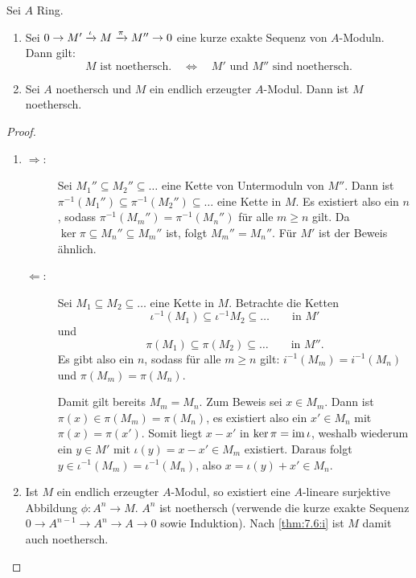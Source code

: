 \documentclass[12pt,a4paper]{scrartcl}
\theoremstyle{cplain}
\theoremstyle{cdef}
\begin{document}

\begin{satz} \label{thm:7.6}
	Sei $A$ Ring.
	\begin{enumerate}
		\item \label{thm:7.6:i} Sei $0\to M'\xrightarrow{\iota} M\xrightarrow{\pi} M''\to 0$ eine kurze exakte Sequenz von $A$-Moduln. Dann gilt:
		\[\text{$M$ ist noethersch.} \quad \Longleftrightarrow\quad \text{$M'$ und $M''$ sind noethersch.}\]
		\item Sei $A$ noethersch und $M$ ein endlich erzeugter $A$-Modul. Dann ist $M$ noethersch.\label{thm:7.6:ii}
	\end{enumerate}
\end{satz}
\begin{proof}
	\leavevmode
	\begin{enumerate}[label=\ref{thm:7.6:\roman*}]
		\item \begin{description}
			\item[\glqq$\Rightarrow$\grqq:] Sei $M_1''\subseteq M_2''\subseteq \dots$ eine Kette von Untermoduln von $M''$. Dann ist $\pi^{-1}(M_1'')\subseteq \pi^{-1}(M_2'')\subseteq \dots$ eine Kette in $M$. Es existiert also ein $n$, sodass $\pi^{-1}(M_m'') = \pi^{-1}(M_n'')$ für alle $m\geq n$ gilt. Da $\ker\pi\subseteq M_n''\subseteq M_m''$ ist, folgt $M_m'' = M_n''$. Für $M'$ ist der Beweis ähnlich.
			\item[\glqq$\Leftarrow$\grqq:] Sei $M_1\subseteq M_2\subseteq\dots$ eine Kette in $M$. Betrachte die Ketten
			\[\iota^{-1}(M_1)\subseteq \iota^{-1}M_2\subseteq\dots\qquad \text{in }M'\]
			und
			\[\pi(M_1)\subseteq \pi(M_2)\subseteq \dots \qquad \text{in }M''.\]
			Es gibt also ein $n$, sodass für alle $m\geq n$ gilt: $i^{-1}(M_m) = i^{-1}(M_n)$ und $\pi(M_m) = \pi(M_n)$.
			
			Damit gilt bereits $M_m = M_n$. Zum Beweis sei $x\in M_m$. Dann ist $\pi(x) \in \pi(M_m) = \pi(M_n)$, es existiert also ein $x'\in M_n$ mit $\pi(x) = \pi(x')$. Somit liegt $x-x'$ in $\operatorname{ker} \pi = \operatorname{im}  \iota$, weshalb wiederum ein $y \in M'$ mit $\iota(y) = x-x'\in M_m$ existiert. Daraus folgt $y\in \iota^{-1}(M_m) = \iota^{-1}(M_n)$, also $x = \iota(y) +x' \in M_n$.
		\end{description}
		\item Ist $M$ ein endlich erzeugter $A$-Modul, so existiert eine $A$-lineare surjektive Abbildung $\phi\colon A^n\to M$. $A^n$ ist noethersch (verwende die kurze exakte Sequenz $0\to A^{n-1}\to A^n\to A \to 0$ sowie Induktion). Nach \ref{thm:7.6:i} ist $M$ damit auch noethersch.
		\qedhere
	\end{enumerate}
\end{proof}
\end{document}
